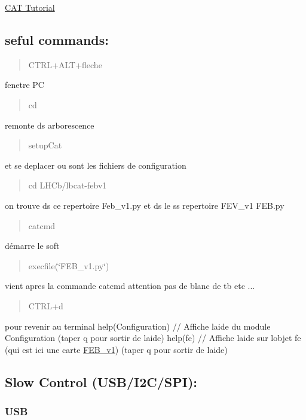 \hyperlink{tutorial}{C\+AT Tutorial}

\subsection*{seful commands\+: }

\begin{quote}
C\+T\+R\+L+\+A\+L\+T+fleche \end{quote}
fenetre PC

\begin{quote}
cd \end{quote}
remonte ds arborescence

\begin{quote}
setup\+Cat \end{quote}
et se deplacer ou sont les fichiers de configuration

\begin{quote}
cd L\+H\+Cb/lbcat-\/febv1 \end{quote}
on trouve ds ce repertoire Feb\+\_\+v1.\+py et ds le ss repertoire F\+E\+V\+\_\+v1 F\+E\+B.\+py

\begin{quote}
catcmd \end{quote}
démarre le soft

\begin{quote}
execfile(\char`\"{}\+F\+E\+B\+\_\+v1.\+py\char`\"{}) \end{quote}
vient apres la commande catcmd attention pas de blanc de tb etc ...

\begin{quote}
C\+T\+R\+L+d \end{quote}
pour revenir au terminal help(\+Configuration) // Affiche l\textquotesingle{}aide du module Configuration (taper \textquotesingle{}q\textquotesingle{} pour sortir de l\textquotesingle{}aide) help(fe) // Affiche l\textquotesingle{}aide sur l\textquotesingle{}objet fe (qui est ici une carte \hyperlink{classFEB__v1}{F\+E\+B\+\_\+v1}) (taper \textquotesingle{}q\textquotesingle{} pour sortir de l\textquotesingle{}aide)

\subsection*{Slow Control (U\+S\+B/\+I2\+C/\+S\+PI)\+: }

\subsubsection*{U\+SB}


